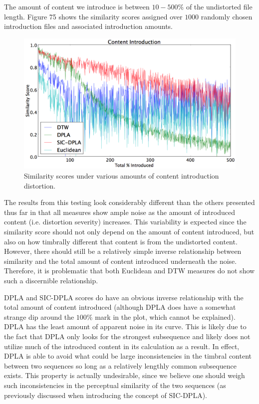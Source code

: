 \documentclass[12pt]{report} 	%
\numberwithin{figure}{chapter}
\numberwithin{table}{chapter}
\numberwithin{equation}{chapter}
\begin{document}
\begin{flushleft}
The amount of content we introduce is between $10-500\%$ of the undistorted file length. Figure 75 shows the similarity scores assigned over $1000$ randomly chosen introduction files and associated introduction amounts.
\vspace{12pt}
\begin{figure}[h!]
\begin{center}
\includegraphics[scale=0.5,width=\linewidth]{ContentIntroduction}
\caption[Content introduction results]{Similarity scores under various amounts of content introduction distortion.}
\end{center}
\end{figure}
The results from this testing look considerably different than the others presented thus far in that all measures show ample noise as the amount of introduced content (i.e. distortion severity) increases. This variability is expected since the similarity score should not only depend on the amount of content introduced, but also on how timbrally different that content is from the undistorted content. However, there should still be a relatively simple inverse relationship between similarity and the total amount of content introduced underneath the noise. Therefore, it is problematic that both Euclidean and DTW measures do not show such a discernible relationship.

DPLA and SIC-DPLA scores do have an obvious inverse relationship with the total amount of content introduced (although DPLA does have a somewhat strange dip around the $100\%$ mark in the plot, which cannot be explained). DPLA has the least amount of apparent noise in its curve. This is likely due to the fact that DPLA only looks for the strongest subsequence and likely does not utilize much of the introduced content in its calculation as a result. In effect, DPLA is able to avoid what could be large inconsistencies in the timbral content between two sequences so long as a relatively lengthly common subsequence exists. This property is actually undesirable, since we believe one should weigh such inconsistencies in the perceptual similarity of the two sequences (as previously discussed when introducing the concept of SIC-DPLA).


\end{flushleft}
\end{document}
